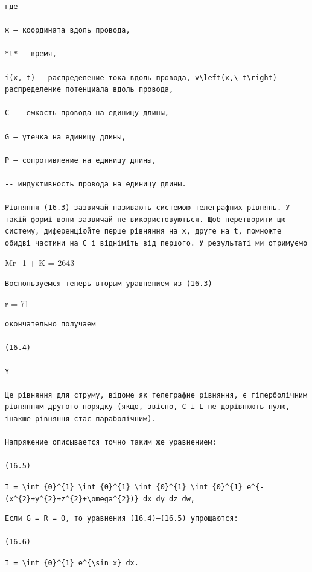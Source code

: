 \documentclass[
  ukrainian,
]{article}
\begin{document}
\begin{verbatim}
где

ж — координата вдоль провода,

*t* — время,

i(x, t) — распределение тока вдоль провода, v\left(x,\ t\right) — распределение потенциала вдоль провода,

С -- емкость провода на единицу длины,

G — утечка на единицу длины,

Р — сопротивление на единицу длины,

-- индуктивность провода на единицу длины.

Рівняння (16.3) зазвичай називають системою телеграфних рівнянь. У такій формі вони зазвичай не використовуються. Щоб перетворити цю систему, диференціюйте перше рівняння на x, друге на t, помножте обидві частини на C і відніміть від першого. У результаті ми отримуємо
\end{verbatim}

Mr\_1 + K = 2643

\begin{verbatim}
Воспользуемся теперь вторым уравнением из (16.3)
\end{verbatim}

r = 71

\begin{verbatim}
окончательно получаем

(16.4)

Y

Це рівняння для струму, відоме як телеграфне рівняння, є гіперболічним рівнянням другого порядку (якщо, звісно, C і L не дорівнюють нулю, інакше рівняння стає параболічним).

Напряжение описывается точно таким же уравнением:

(16.5)
\end{verbatim}

\texttt{I\ =\ \textbackslash{}int\_\{0\}\^{}\{1\}\ \textbackslash{}int\_\{0\}\^{}\{1\}\ \textbackslash{}int\_\{0\}\^{}\{1\}\ \textbackslash{}int\_\{0\}\^{}\{1\}\ e\^{}\{-(x\^{}\{2\}+y\^{}\{2\}+z\^{}\{2\}+\textbackslash{}omega\^{}\{2\})\}\ dx\ dy\ dz\ dw,}

\begin{verbatim}
Если G = R = 0, то уравнения (16.4)—(16.5) упрощаются:

(16.6)
\end{verbatim}

\texttt{I\ =\ \textbackslash{}int\_\{0\}\^{}\{1\}\ e\^{}\{\textbackslash{}sin\ x\}\ dx.}
\end{document}
